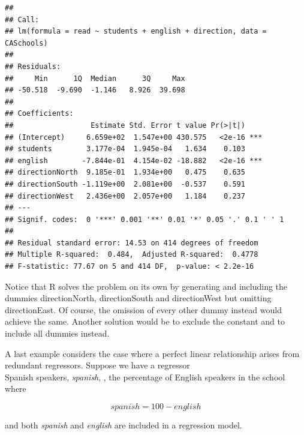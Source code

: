 \documentclass[]{book}
\newenvironment{Shaded}{\begin{snugshade}}{\end{snugshade}}
\newcommand{\CommentTok}[1]{\textcolor[rgb]{0.56,0.35,0.01}{\textit{#1}}}
\newcommand{\DataTypeTok}[1]{\textcolor[rgb]{0.13,0.29,0.53}{#1}}
\newcommand{\DecValTok}[1]{\textcolor[rgb]{0.00,0.00,0.81}{#1}}
\newcommand{\KeywordTok}[1]{\textcolor[rgb]{0.13,0.29,0.53}{\textbf{#1}}}
\newcommand{\NormalTok}[1]{#1}
\newcommand{\OperatorTok}[1]{\textcolor[rgb]{0.81,0.36,0.00}{\textbf{#1}}}
\newcommand{\StringTok}[1]{\textcolor[rgb]{0.31,0.60,0.02}{#1}}
\begin{document}
\begin{verbatim}
## 
## Call:
## lm(formula = read ~ students + english + direction, data = CASchools)
## 
## Residuals:
##     Min      1Q  Median      3Q     Max 
## -50.518  -9.690  -1.146   8.926  39.698 
## 
## Coefficients:
##                  Estimate Std. Error t value Pr(>|t|)    
## (Intercept)     6.659e+02  1.547e+00 430.575   <2e-16 ***
## students        3.177e-04  1.945e-04   1.634    0.103    
## english        -7.844e-01  4.154e-02 -18.882   <2e-16 ***
## directionNorth  9.185e-01  1.934e+00   0.475    0.635    
## directionSouth -1.119e+00  2.081e+00  -0.537    0.591    
## directionWest   2.436e+00  2.057e+00   1.184    0.237    
## ---
## Signif. codes:  0 '***' 0.001 '**' 0.01 '*' 0.05 '.' 0.1 ' ' 1
## 
## Residual standard error: 14.53 on 414 degrees of freedom
## Multiple R-squared:  0.484,  Adjusted R-squared:  0.4778 
## F-statistic: 77.67 on 5 and 414 DF,  p-value: < 2.2e-16
\end{verbatim}

Notice that R solves the problem on its own by generating and including the dummies directionNorth, directionSouth and directionWest but omitting directionEast. Of course, the omission of every other dummy instead would achieve the same. Another solution would be to exclude the constant and to include all dummies instead.

A last example considers the case where a perfect linear relationship arises from redundant regressors. Suppose we have a regressor\\
Spanish speakers, \emph{spanish}, , the percentage of English speakers in the school where

\begin{equation}
spanish = 100 - english  
\end{equation}

and both \emph{spanish} and \emph{english} are included in a regression model.

\begin{Shaded}
\end{Shaded}
\end{document}
